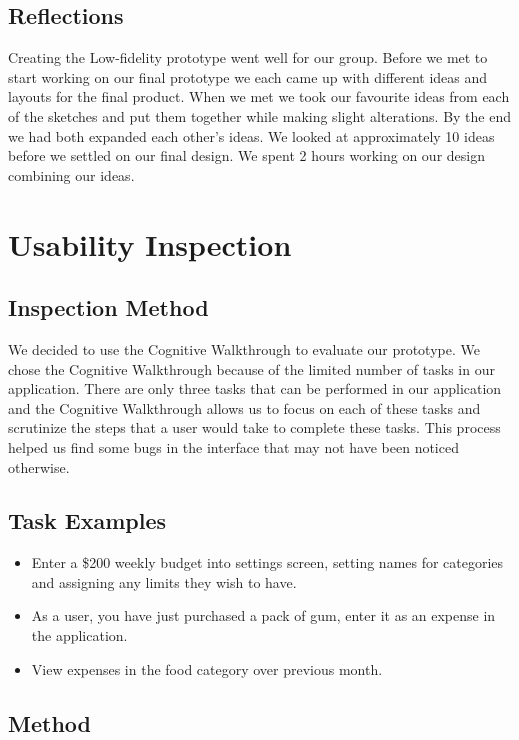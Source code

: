 \documentclass{chi2011}
\begin{document}
    \subsection{Reflections}

    Creating the Low-fidelity prototype went well for our group. Before we met
    to start working on our final prototype we each came up with different
    ideas and layouts for the final product. When we met we took our favourite
    ideas from each of the sketches and put them together while making slight
    alterations. By the end we had both expanded each other's ideas. We looked at
    approximately 10 ideas before we settled on our final design.
    We spent 2 hours working on our design combining our ideas.

\section{Usability Inspection}
    \subsection{Inspection Method}
    We decided to use the Cognitive Walkthrough to evaluate our prototype. We
	chose the Cognitive Walkthrough because of the limited number of tasks in
    our application. There are only three tasks that can be performed in our
    application and the Cognitive Walkthrough allows us to focus on each of these
	tasks and scrutinize the steps that a user would take to complete these
    tasks. This process helped us find some bugs in the interface that may not
    have been noticed otherwise.

    \subsection{Task Examples}
    \begin{itemize}
        \item Enter a \$200 weekly budget into settings screen, setting names for categories and assigning any limits
            they wish to have.
        \item As a user, you have just purchased a pack of gum, enter it as an expense in the application.
        \item View expenses in the food category over previous month.
    \end{itemize}

    \subsection{Method}
\end{document}
